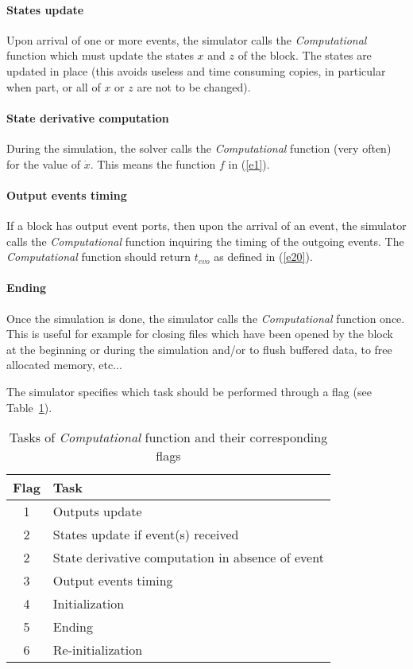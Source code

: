 \documentclass{book}
\newcommand{\computational}{{\em Computational }}
\begin{document}
\paragraph{States update} Upon arrival of one or more events,  the
simulator calls the \computational function which must update the
states $x$ and $z$ of the block. The states are updated in place 
(this avoids useless 
and time consuming copies, in particular when part, or all of $x$ or $z$
are not to be changed). 

\paragraph{State derivative computation} During the simulation, the solver calls
the \computational function (very often) for the value of
$\dot{x}$. This means the function $f$ in (\ref{e1}).

\paragraph{Output events timing} If a block has output event ports, then
upon the arrival of an event, the simulator calls the \computational
function inquiring the timing of the outgoing events. The
\computational function should return $t_{evo}$ as defined in (\ref{e20}).

\paragraph{Ending} Once the simulation is done, the simulator calls
the \computational function once. This is useful for example for closing files
which have been opened by the block at the beginning or during the
simulation and/or to flush buffered data, to free allocated memory, etc...

\bigskip

The simulator specifies which task should be performed
through a flag (see Table~\ref{tab2}).

\begin{table}[ht]
\begin{center}
\begin{tabular}{|c|l|}
\hline
Flag & Task \\
\hline
1 & Outputs update \\
2 & States update if event(s) received \\
2 & State derivative computation in absence of event \\
3 & Output events timing \\
4 & Initialization \\
5 & Ending \\
6 & Re-initialization \\
\hline
\end{tabular}
\caption{Tasks of \computational function and their corresponding flags}
\label{tab2}
\end{center}
\end{table}
\end{document}
